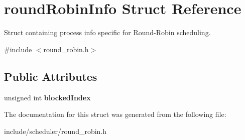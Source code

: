 \hypertarget{structroundRobinInfo}{\section{round\-Robin\-Info \-Struct \-Reference}
\label{d2/de3/structroundRobinInfo}
}


\-Struct containing process info specific for \-Round-\/\-Robin scheduling.  




{\ttfamily \#include $<$round\-\_\-robin.\-h$>$}

\subsection*{\-Public \-Attributes}
\begin{DoxyCompactItemize}
\item 
\hypertarget{structroundRobinInfo_a6c27850c4a7950e4aaa7cbcd532dca4b}{unsigned int {\bfseries blocked\-Index}}\label{d2/de3/structroundRobinInfo_a6c27850c4a7950e4aaa7cbcd532dca4b}

\end{DoxyCompactItemize}


\-The documentation for this struct was generated from the following file\-:\begin{DoxyCompactItemize}
\item 
include/scheduler/round\-\_\-robin.\-h\end{DoxyCompactItemize}
